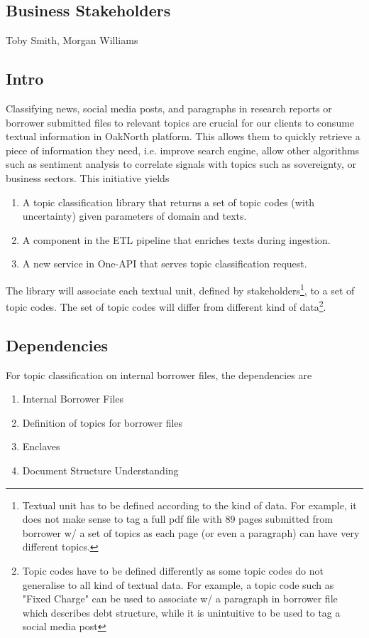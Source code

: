 \documentclass[]{article}
\begin{document}
\subsection{Business Stakeholders}
Toby Smith, Morgan Williams

\subsection{Intro}
Classifying news, social media posts, and paragraphs in research reports or 
borrower submitted files to relevant topics are crucial for our clients to 
consume textual 
information in OakNorth platform. 
This allows them to quickly retrieve a piece of information they need, i.e. 
improve search engine, allow other algorithms such as sentiment analysis to 
correlate signals with
topics such as sovereignty, or business sectors. This initiative yields 

\begin{enumerate}
    \item A topic classification library that returns a set of topic codes 
    (with uncertainty)
    given parameters of domain and texts.
    \item A component in the ETL pipeline that enriches texts during ingestion.
    \item A new service in One-API that serves topic classification request.
\end{enumerate}
The library will associate each textual unit, defined by 
stakeholders\footnote{Textual unit has to be defined according to 
the kind of data. For example, it does not make 
sense to tag a full pdf file with 89 pages submitted from borrower w/ a set of 
topics as each page (or even a paragraph) can have very different topics. }, to 
a set of topic codes. The set of topic codes will differ from 
different kind of data\footnote{Topic codes have to be defined differently as 
some topic codes do not generalise to all kind of textual data. For 
example, a topic code such as "Fixed Charge" can be used to associate w/ a 
paragraph in borrower file which describes debt structure, while it is 
unintuitive to be used to tag a social media post}.

\subsection{Dependencies}
For topic classification on internal borrower files, the dependencies are

\begin{enumerate}
    \item Internal Borrower Files
    \item Definition of topics for borrower files
    \item Enclaves \cite{ppdp2019on}
    \item Document Structure Understanding
\end{enumerate}
\end{document}
